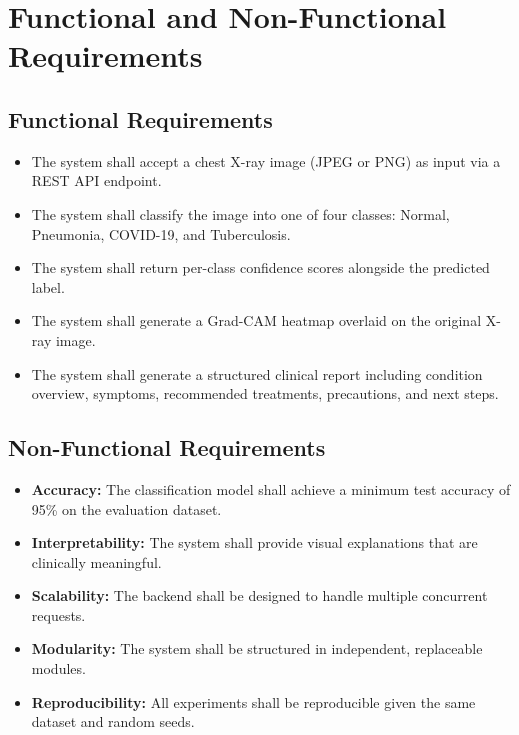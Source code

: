 \documentclass[12pt]{report}
\begin{document}
\section{Functional and Non-Functional Requirements}

\subsection{Functional Requirements}
\begin{itemize}
    \item The system shall accept a chest X-ray image (JPEG or PNG) as
    input via a REST API endpoint.
    \item The system shall classify the image into one of four classes:
    Normal, Pneumonia, COVID-19, and Tuberculosis.
    \item The system shall return per-class confidence scores alongside
    the predicted label.
    \item The system shall generate a Grad-CAM heatmap overlaid on the
    original X-ray image.
    \item The system shall generate a structured clinical report including
    condition overview, symptoms, recommended treatments, precautions,
    and next steps.
\end{itemize}

\subsection{Non-Functional Requirements}
\begin{itemize}
    \item \textbf{Accuracy:} The classification model shall achieve a
    minimum test accuracy of 95\% on the evaluation dataset.
    \item \textbf{Interpretability:} The system shall provide visual
    explanations that are clinically meaningful.
    \item \textbf{Scalability:} The backend shall be designed to handle
    multiple concurrent requests.
    \item \textbf{Modularity:} The system shall be structured in
    independent, replaceable modules.
    \item \textbf{Reproducibility:} All experiments shall be reproducible
    given the same dataset and random seeds.
\end{itemize}

\end{document}
